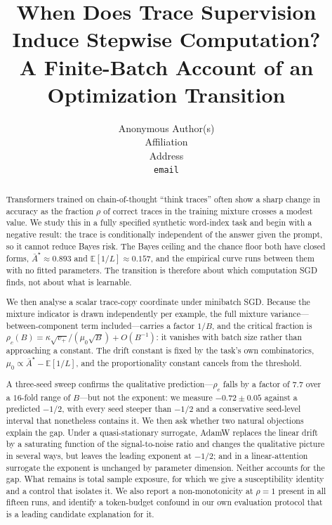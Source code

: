 \documentclass{article}
\title{When Does Trace Supervision Induce Stepwise Computation?\\
A Finite-Batch Account of an Optimization Transition}
\author{%
  Anonymous Author(s)\\
  Affiliation\\
  Address\\
  \texttt{email}
}
\theoremstyle{plain}
\theoremstyle{definition}
\theoremstyle{remark}
\newcommand{\E}{\mathbb{E}}
\newcommand{\1}{\mathbf{1}}
\begin{document}
\maketitle

\begin{abstract}
Transformers trained on chain-of-thought ``think traces'' often show a sharp
change in accuracy as the fraction $\rho$ of correct traces in the training
mixture crosses a modest value. We study this in a fully specified synthetic
word-index task and begin with a negative result: the trace is conditionally
independent of the answer given the prompt, so it cannot reduce Bayes risk. The
Bayes ceiling and the chance floor both have closed forms, $\bar A^\star \approx
0.893$ and $\E[1/L]\approx0.157$, and the empirical curve runs between them with
no fitted parameters. The transition is therefore about which computation SGD
finds, not about what is learnable.

We then analyse a scalar trace-copy coordinate under minibatch SGD. Because the
mixture indicator is drawn independently per example, the full mixture
variance---between-component term included---carries a factor $1/B$, and the
critical fraction is $\rho_c(B) = \kappa\sqrt{v_+}/(\mu_0\sqrt B) + O(B^{-1})$:
it vanishes with batch size rather than approaching a constant. The drift
constant is fixed by the task's own combinatorics, $\mu_0 \propto \bar A^\star -
\E[1/L]$, and the proportionality constant cancels from the threshold.

A three-seed sweep confirms the qualitative prediction---$\rho_c$ falls by a
factor of $7.7$ over a $16$-fold range of $B$---but not the exponent: we measure
$-0.72\pm0.05$ against a predicted $-1/2$, with every seed steeper than $-1/2$
and a conservative seed-level interval that nonetheless contains it. We then ask
whether two natural objections explain the gap. Under a quasi-stationary
surrogate, AdamW replaces the linear drift by a saturating function of the
signal-to-noise ratio and changes the qualitative picture in several ways, but
leaves the leading exponent at $-1/2$; and in a linear-attention surrogate the
exponent is unchanged by parameter dimension. Neither accounts for the gap. What
remains is total sample exposure, for which we give a susceptibility identity and
a control that isolates it. We also report a non-monotonicity at $\rho=1$ present
in all fifteen runs, and identify a token-budget confound in our own evaluation
protocol that is a leading candidate explanation for it.
\end{abstract}
\end{document}
